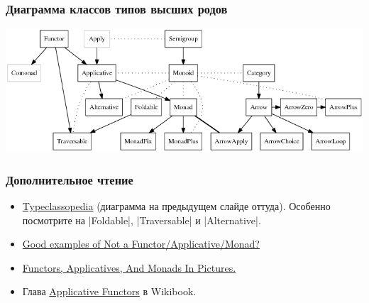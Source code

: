 \documentclass[11pt]{beamer}
\begin{document}
\begin{frame}[fragile]
  \frametitle{Диаграмма классов типов высших родов}
  \includegraphics[width=\linewidth]{Typeclassopedia-diagram.png}
\end{frame}

%
%

\begin{frame}[fragile]
  \frametitle{Дополнительное чтение}
  \begin{itemize}
    \item \href{https://wiki.haskell.org/Typeclassopedia}{Typeclassopedia} (диаграмма на предыдущем слайде оттуда). Особенно посмотрите на \haskinline|Foldable|, \haskinline|Traversable| и \haskinline|Alternative|.
    \item \href{https://stackoverflow.com/questions/7220436/good-examples-of-not-a-functor-functor-applicative-monad}{Good examples of Not a Functor/Applicative/Monad?}
    \item     \href{http://adit.io/posts/2013-04-17-functors,_applicatives,_and_monads_in_pictures.html}{Functors, Applicatives, And Monads In Pictures.}
    \item Глава \href{https://en.wikibooks.org/wiki/Haskell/Applicative_functors}{Applicative Functors} в Wikibook.
  \end{itemize}
\end{frame}
\end{document}
